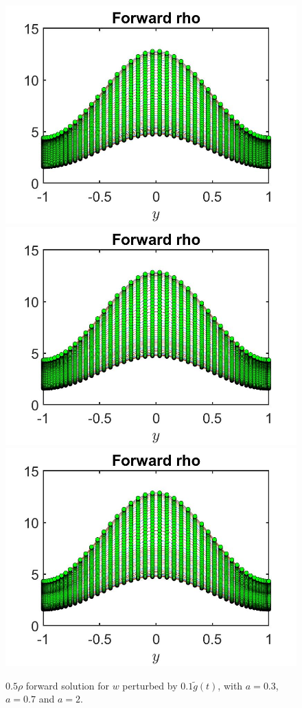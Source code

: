 \documentclass[11pt, a4paper]{article}
\theoremstyle{definition}
\begin{document}
	\begin{figure}[h]
		\includegraphics[scale=0.25]{rho0503.jpg}
		\includegraphics[scale=0.25]{rho0507.jpg}
		\includegraphics[scale=0.25]{rho052.jpg}
		\caption{$0.5\rho$ forward solution for $w$ perturbed by $0.1 \tilde g(t)$, with $a = 0.3$, $a=0.7$ and $a = 2$. }
		\label{gTest2}
	\end{figure}
	
\end{document}
